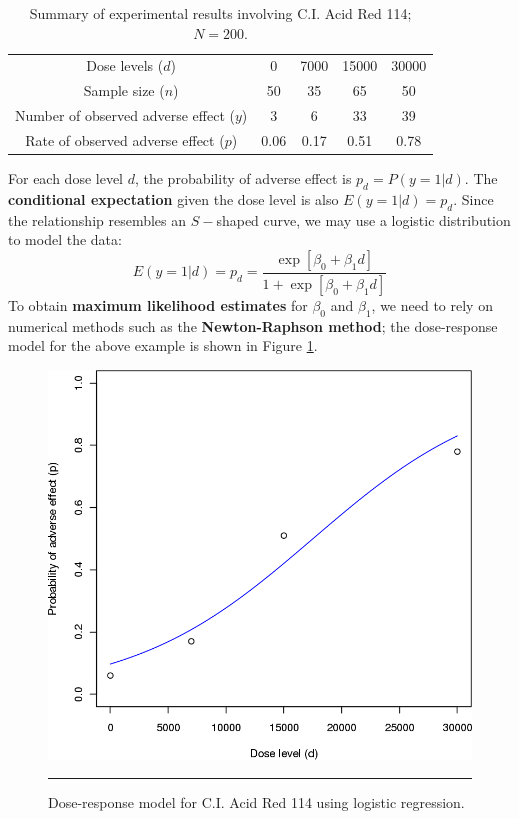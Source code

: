      \begin{table}[!t]
         \centering
         \begin{tabular}{c c c c c}
         \hline
        Dose levels ($d$) & 0 & 7000 & 15000 & 30000\\
        Sample size ($n$) & 50 & 35 & 65 & 50\\
        Number of observed adverse effect ($y$) & 3 & 6 & 33 &39\\
        Rate of observed adverse effect ($p$) & 0.06 & 0.17 & 0.51 & 0.78\\
        \hline
         \end{tabular}
         \caption[\small Summary of experimental results involving C.I. Acid Red 114]{Summary of experimental results involving C.I. Acid Red 114; $N=200$.}
         \label{tab:SA8}
     \end{table}
For each dose level $d$, the probability of adverse effect is $p_{d}=P(y=1|d)$. The \textbf{conditional expectation} given the dose level is also $E(y=1|d)=p_{d}$. Since the relationship resembles an $S-$shaped curve, we may use a  logistic distribution to model the data:
\begin{equation*}
    E(y=1|d)=p_{d}=\frac{\exp[\beta_{0}+\beta_{1}d]}{1+\exp[\beta_{0}+\beta_{1}d]}
\end{equation*}
To obtain \textbf{maximum likelihood estimates} for $\beta_{0}$ and $\beta_{1}$, we need to rely on numerical methods such as the \textbf{Newton-Raphson method}; the dose-response model for the above example is shown in Figure \ref{fig:testA8}.

\begin{figure}[!t]
\centering
  \includegraphics[width=0.5\linewidth]{images/SA/testA8.png}
  \caption[\small Dose-response model for C.I. Acid Red 114 using logistic regression]{\small Dose-response model for C.I. Acid Red 114 using logistic regression.}
  \label{fig:testA8}\hrule
\end{figure}
